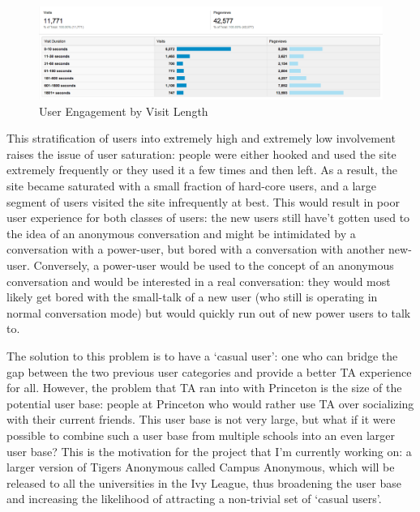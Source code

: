 \begin{figure}[H]
\centering
\includegraphics[trim= 0mm 0mm 0mm 0mm, clip, scale=0.3]{./Figures/UserStratificationVisitLength}
\caption{User Engagement by Visit Length}
\label{fig:UserStratificationVisitLength}
\end{figure}

This stratification of users into extremely high and extremely low involvement raises the issue of user saturation: people were either hooked and used the site extremely frequently or they used it a few times and then left. As a result, the site became saturated with a small fraction of hard-core users, and a large segment of users visited the site infrequently at best. This would result in poor user experience for both classes of users: the new users still have't gotten used to the idea of an anonymous conversation and might be intimidated by a conversation with a power-user, but bored with a conversation with another new-user. Conversely, a power-user would be used to the concept of an anonymous conversation and would be interested in a real conversation: they would most likely get bored with the small-talk of a new user (who still is operating in normal conversation mode) but would quickly run out of new power users to talk to.

The solution to this problem is to have a `casual user': one who can bridge the gap between the two previous user categories and provide a better TA experience for all. However, the problem that TA ran into with Princeton is the size of the potential user base: people at Princeton who would rather use TA over socializing with their current friends. This user base is not very large, but what if it were possible to combine such a user base from multiple schools into an even larger user base? This is the motivation for the project that I'm currently working on: a larger version of Tigers Anonymous called Campus Anonymous, which will be released to all the universities in the Ivy League, thus broadening the user base and increasing the likelihood of attracting a non-trivial set of `casual users'.
